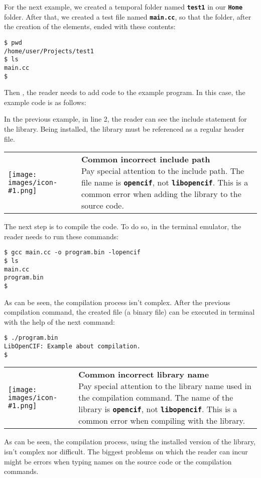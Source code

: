\documentclass[11pt,twoside,openany,x11names,svgnames]{memoir}
\makeatletter
\newcommand{\IconNote}[3]
{
	\begin{table}[ht]
	\begin{tabular}{ lm{\dimexpr\textwidth-8\tabcolsep-\wd0}@{}}
		\toprule
		\texttt{[image: images/icon-\#1.png]}
		&
		\parbox[t]{155mm}{
		\textbf{#2} \\
		#3
		}
	\end{tabular}
\end{table}
}
\makeatother
\begin{document}
For the next example, we created a temporal folder named \textbf{\texttt{test1}} in our  \textbf{\texttt{Home}} folder. After that, we created a test file named \textbf{\texttt{main.cc}}, so that the folder, after the creation of the elements, ended with these contents:

\begin{lstlisting}[frame=single,style=SystemCommandStyle]
$ pwd
/home/user/Projects/test1
$ ls
main.cc
$
\end{lstlisting}

Then , the reader needs to add code to the example program. In this case, the example code is as follows:



In the previous example, in line 2, the reader can see the include statement for the library. Being installed, the library must be referenced as a regular header file.

\IconNote
	{warning}
	{Common incorrect include path}
	{Pay special attention to the include path. The file name is \textbf{\texttt{opencif}}, not \textbf{\texttt{libopencif}}. This is a common error when adding the library to the source code.}
	
The next step is to compile the code. To do so, in the terminal emulator, the reader needs to run these commands:

\begin{lstlisting}[frame=single,style=SystemCommandStyle]
$ gcc main.cc -o program.bin -lopencif
$ ls
main.cc
program.bin
$
\end{lstlisting}

As can be seen, the compilation process isn't complex. After the previous compilation command, the created file (a binary file) can be executed in terminal with the help of the next command:

\begin{lstlisting}[frame=single,style=SystemCommandStyle]
$ ./program.bin
LibOpenCIF: Example about compilation.
$
\end{lstlisting}

\IconNote
	{warning}
	{Common incorrect library name}
	{Pay special attention to the library name used in the compilation command. The name of the library is \textbf{\texttt{opencif}}, not \textbf{\texttt{libopencif}}. This is a common error when compiling with the library.}
	
As can be seen, the compilation process, using the installed version of the library, isn't complex nor difficult. The biggest problems on which the reader can incur might be errors when typing names on the source code or the compilation commands.
\end{document}
